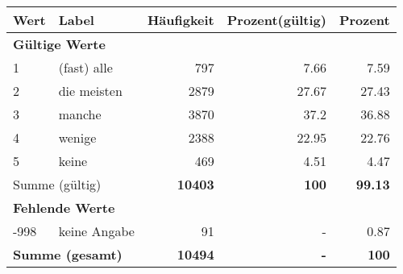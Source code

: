      \begin{longtable}{lXrrr}
     \toprule
     \textbf{Wert} & \textbf{Label} & \textbf{Häufigkeit} & \textbf{Prozent(gültig)} & \textbf{Prozent} \\
     \endhead
     \midrule
     \multicolumn{5}{l}{\textbf{Gültige Werte}}\\

     1 &
     \multicolumn{1}{X}{ (fast) alle   } &


       \num{797} &
       \num[round-mode=places,round-precision=2]{7.66} &
         \num[round-mode=places,round-precision=2]{7.59} \\

     2 &
     \multicolumn{1}{X}{ die meisten   } &


       \num{2879} &
       \num[round-mode=places,round-precision=2]{27.67} &
         \num[round-mode=places,round-precision=2]{27.43} \\

     3 &
     \multicolumn{1}{X}{ manche   } &


       \num{3870} &
       \num[round-mode=places,round-precision=2]{37.2} &
         \num[round-mode=places,round-precision=2]{36.88} \\

     4 &
     \multicolumn{1}{X}{ wenige   } &


       \num{2388} &
       \num[round-mode=places,round-precision=2]{22.95} &
         \num[round-mode=places,round-precision=2]{22.76} \\

     5 &
     \multicolumn{1}{X}{ keine   } &


       \num{469} &
       \num[round-mode=places,round-precision=2]{4.51} &
         \num[round-mode=places,round-precision=2]{4.47} \\
     \midrule
     \multicolumn{2}{l}{Summe (gültig)} &
       \textbf{\num{10403}} &
     \textbf{\num{100}} &
       \textbf{\num[round-mode=places,round-precision=2]{99.13}} \\
     \multicolumn{5}{l}{\textbf{Fehlende Werte}}\\
       -998 &
       keine Angabe &
         \num{91} &
        - &
         \num[round-mode=places,round-precision=2]{0.87} \\
     \midrule
     \multicolumn{2}{l}{\textbf{Summe (gesamt)}} &
          \textbf{\num{10494}} &
        \textbf{-} &
        \textbf{\num{100}} \\
     \bottomrule
     \end{longtable}
     
